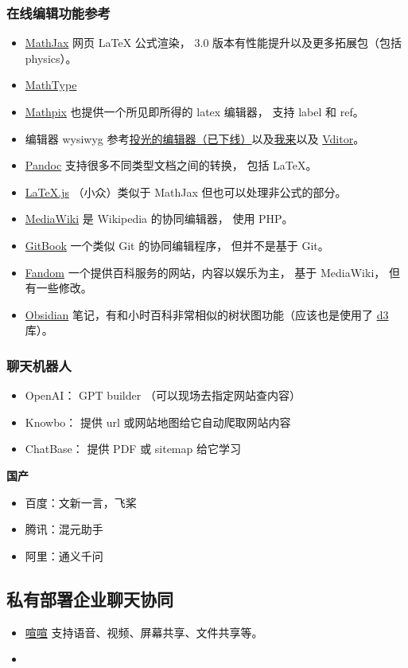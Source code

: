 \subsubsection{在线编辑功能参考}
\begin{itemize}
\item \href{https://www.mathjax.org}{MathJax} 网页 LaTeX 公式渲染， 3.0 版本有性能提升以及更多拓展包（包括 physics）。
\item \href{https://demo.wiris.com/mathtype/en/}{MathType}
\item \href{https://mathpix.com/ocr?gclid=CjwKCAiAy_CcBhBeEiwAcoMRHKnSPGjROmFGBj5R_Ev3hke7lG7xNIzKDHv5FgkMFq62aXRpISt_LhoC47YQAvD_BwE}{Mathpix} 也提供一个所见即所得的 latex 编辑器， 支持 label 和 ref。
\item 编辑器 wysiwyg 参考\href{https://editoe.com}{投光的编辑器（已下线）}以及\href{https://www.wolai.com}{我来}以及 \href{https://github.com/Vanessa219/vditor}{Vditor}。
\item \href{https://pandoc.org/}{Pandoc} 支持很多不同类型文档之间的转换， 包括 LaTeX。
\item \href{https://github.com/michael-brade/LaTeX.js}{LaTeX.js} （小众）类似于 MathJax 但也可以处理非公式的部分。
\item \href{https://www.mediawiki.org/wiki/MediaWiki}{MediaWiki} 是 Wikipedia 的协同编辑器， 使用 PHP。
\item \href{https://www.gitbook.com/}{GitBook} 一个类似 Git 的协同编辑程序， 但并不是基于 Git。
\item \href{https://www.fandom.com/}{Fandom} 一个提供百科服务的网站，内容以娱乐为主， 基于 MediaWiki， 但有一些修改。
\item \href{https://obsidian.md/}{Obsidian} 笔记，有和小时百科非常相似的树状图功能（应该也是使用了 \href{https://d3js.org/}{d3} 库）。
\end{itemize}

\subsubsection{聊天机器人}
\begin{itemize}
\item OpenAI： GPT builder （可以现场去指定网站查内容）
\item Knowbo： 提供 url 或网站地图给它自动爬取网站内容
\item ChatBase： 提供 PDF 或 sitemap 给它学习
\end{itemize}

\textbf{国产}
\begin{itemize}
\item 百度：文新一言，飞桨
\item 腾讯：混元助手
\item 阿里：通义千问
\end{itemize}

\subsection{私有部署企业聊天协同}
\begin{itemize}
\item \href{https://xuanim.com/}{喧喧} 支持语音、视频、屏幕共享、文件共享等。
\item 
\end{itemize}

